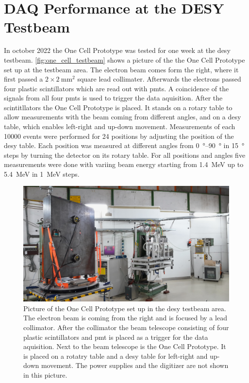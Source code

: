 \chapter{DAQ Performance at the DESY Testbeam}
In october 2022 the One Cell Prototype was tested for one week at the \ac{desy} testbeam.
\autoref{fig:one_cell_testbeam} shows a picture of the the One Cell Prototype set up at the testbeam area.
The electron beam comes form the right, where it first passed a $2\times\SI{2}{\milli\meter\squared}$ square lead collimater.
Afterwards the electrons passed four plastic scintillators which are read out with \acp{pmt}.
A coincidence of the signals from all four \acp{pmt} is used to trigger the data aquisition.
After the scintitllators the One Cell Prototype is placed.
It stands on a rotary table to allow measurements with the beam coming from different angles, and on a \ac{desy} table, which enables left-right and up-down movement.
Measurements of each \num{10000} events were performed for 24 positions by adjusting the position of the \ac{desy} table.
Each position was measured at different angles from \SIrange{0}{90}{\degree} in \SI{15}{\degree} steps by turning the detector on its rotary table.
For all positions and angles five measurements were done with variing beam energy starting from \SI{1.4}{\mega\electronvolt} up to \SI{5.4}{\mega\electronvolt} in \SI{1}{\mega\electronvolt} steps.
\begin{figure}
	\centering
	\includegraphics[width=1.\textwidth]{pictures/one_cell_testbeam}
	\caption[One Cell Prototype at the \ac{desy} testbeam]{Picture of the One Cell Prototype set up in the \ac{desy} testbeam area. The electron beam is coming from the right and is focused by a lead collimator. After the collimator the beam telescope consisting of four plastic scintillators and \ac{pmt} is placed as a trigger for the data aquisition. Next to the beam telescope is the One Cell Prototype. It is placed on a rotatry table and a \ac{desy} table for left-right and up-down movement. The power supplies and the digitizer are not shown in this picture.}
	\label{fig:one_cell_testbeam}
\end{figure}

